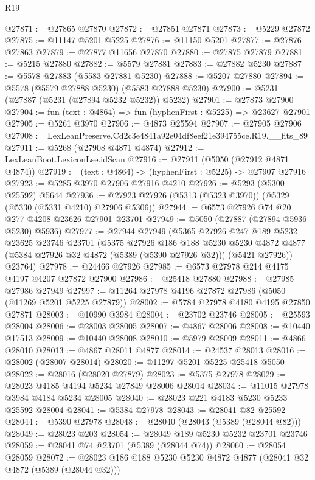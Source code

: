 \begin{lexlean}{R19}
\begin{coremodule}
@27871 := @27865 @27870
@27872 := @27851 @27871
@27873 := @5229 @27872
@27875 := @11147 @5201 @5225
@27876 := @11150 @5201
@27877 := @27876 @27863
@27879 := @27877 @11656 @27870
@27880 := @27875 @27879
@27881 := @5215 @27880
@27882 := @5579 @27881
@27883 := @27882 @5230
@27887 := @5578 @27883 (@5583 @27881 @5230)
@27888 := @5207 @27880
@27894 := @5578 (@5579 @27888 @5230) (@5583 @27888 @5230)
@27900 := @5231 (@27887 (@5231 (@27894 @5232 @5232)) @5232)
@27901 := @27873 @27900
@27904 := fun (text : @4864) => fun (hyphenFirst : @5225) => @23627 @27901
@27905 := @5261 @3970
@27906 := @4873 @25594
@27907 := @27905 @27906
@27908 := LexLeanPreserve.Cd2c3e4841a92e04df8eef21e394755ce.R19.__fits_89
@27911 := @5268 (@27908 @4871 @4874)
@27912 := LexLeanBoot.LexiconLse.idScan
@27916 := @27911 (@5050 (@27912 @4871 @4874))
@27919 := (text : @4864) -> (hyphenFirst : @5225) -> @27907 @27916
@27923 := @5285 @3970 @27906 @27916 @4210
@27926 := @5293 (@5300 @25592) @5644
@27936 := @27923 @27926 (@5313 (@5323 @3970)) (@5329 (@5330 (@5331 @4210) @27906 @5306))
@27944 := @6573 @27926 @74 @20 @277 @4208 @23626 @27901 @23701
@27949 := @5050 (@27887 (@27894 @5936 @5230) @5936)
@27977 := @27944
    @27949
    (@5365
      @27926
      @247
      @189
      @5232
      @23625
      @23746
      @23701
      (@5375
        @27926
        @186
        @188
        @5230
        @5230
        @4872
        @4877
        (@5384 @27926 @32 @4872 (@5389 (@5390 @27926 @32)))
        (@5421 @27926))
      @23764)
@27978 := @24466 @27926
@27985 := @6573 @27978 @214 @4175 @4197 @4207 @27872 @27900
@27986 := @25418 @27880
@27988 := @27985 @27986 @27949
@27997 := @11264 @27978 @4196 @27872 @27986 (@5050 (@11269 @5201 @5225 @27879))
@28002 := @5784 @27978 @4180 @4195 @27850 @27871
@28003 := @10990 @3984
@28004 := @23702 @23746
@28005 := @25593 @28004
@28006 := @28003 @28005
@28007 := @4867 @28006
@28008 := @10440 @17513
@28009 := @10440 @28008
@28010 := @5979 @28009
@28011 := @4866 @28010
@28013 := @4867 @28011 @4877
@28014 := @24537 @28013
@28016 := @28002 (@28007 @28014)
@28020 := @11297 @5201 @5225 @25418 @5050
@28022 := @28016 (@28020 @27879)
@28023 := @5375 @27978
@28029 := @28023 @4185 @4194 @5234 @27849 @28006 @28014
@28034 := @11015 @27978 @3984 @4184 @5234 @28005
@28040 := @28023 @221 @4183 @5230 @5233 @25592 @28004
@28041 := @5384 @27978
@28043 := @28041 @82 @25592
@28044 := @5390 @27978
@28048 := @28040 (@28043 (@5389 (@28044 @82)))
@28049 := @28023 @203
@28054 := @28049 @189 @5230 @5232 @23701 @23746
@28059 := @28041 @74 @23701 (@5389 (@28044 @74))
@28060 := @28054 @28059
@28072 := @28023 @186 @188 @5230 @5230 @4872 @4877 (@28041 @32 @4872 (@5389 (@28044 @32)))

\end{coremodule}
\end{lexlean}
